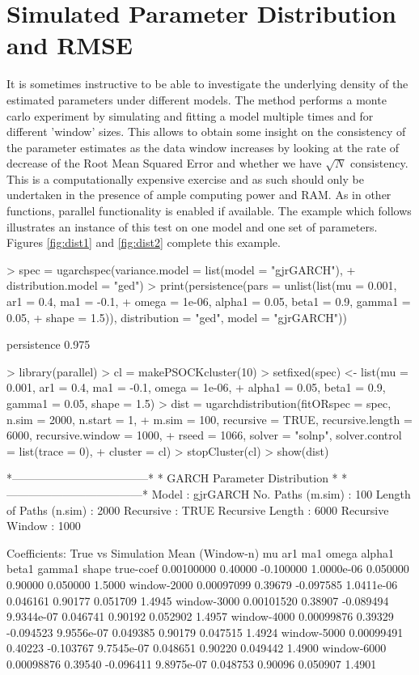 \section{Simulated Parameter Distribution and RMSE}\label{section:ugarchdist}
It is sometimes instructive to be able to investigate the underlying
density of the estimated parameters under different models. The \verb@ugarchdistribution@
method performs a monte carlo experiment by simulating and fitting a model
multiple times and for different 'window' sizes. This allows to obtain some insight
on the consistency of the parameter estimates as the data window increases by
looking at the rate of decrease of the Root Mean Squared Error and whether we
have $\sqrt N$ consistency. This is a computationally expensive exercise and as
such should only be undertaken in the presence of ample computing power and RAM.
As in other functions, parallel functionality is enabled if available.
The example which follows illustrates an instance of this test on one model and
one set of parameters. Figures \ref{fig:dist1} and \ref{fig:dist2} complete this
example.
\begin{Schunk}
\begin{Sinput}
> spec = ugarchspec(variance.model = list(model = "gjrGARCH"),
+     distribution.model = "ged")
> print(persistence(pars = unlist(list(mu = 0.001, ar1 = 0.4, ma1 = -0.1,
+     omega = 1e-06, alpha1 = 0.05, beta1 = 0.9, gamma1 = 0.05,
+     shape = 1.5)), distribution = "ged", model = "gjrGARCH"))
\end{Sinput}
\begin{Soutput}
persistence
      0.975
\end{Soutput}
\begin{Sinput}
> library(parallel)
> cl = makePSOCKcluster(10)
> setfixed(spec) <- list(mu = 0.001, ar1 = 0.4, ma1 = -0.1, omega = 1e-06,
+     alpha1 = 0.05, beta1 = 0.9, gamma1 = 0.05, shape = 1.5)
> dist = ugarchdistribution(fitORspec = spec, n.sim = 2000, n.start = 1,
+     m.sim = 100, recursive = TRUE, recursive.length = 6000, recursive.window = 1000,
+     rseed = 1066, solver = "solnp", solver.control = list(trace = 0),
+     cluster = cl)
> stopCluster(cl)
> show(dist)
\end{Sinput}
\begin{Soutput}
*------------------------------------*
*    GARCH Parameter Distribution    *
*------------------------------------*
Model : gjrGARCH
No. Paths (m.sim) : 100
Length of Paths (n.sim) : 2000
Recursive : TRUE
Recursive Length : 6000
Recursive Window : 1000

Coefficients: True vs Simulation Mean (Window-n)
                    mu     ar1       ma1      omega   alpha1   beta1   gamma1  shape
true-coef   0.00100000 0.40000 -0.100000 1.0000e-06 0.050000 0.90000 0.050000 1.5000
window-2000 0.00097099 0.39679 -0.097585 1.0411e-06 0.046161 0.90177 0.051709 1.4945
window-3000 0.00101520 0.38907 -0.089494 9.9344e-07 0.046741 0.90192 0.052902 1.4957
window-4000 0.00099876 0.39329 -0.094523 9.9556e-07 0.049385 0.90179 0.047515 1.4924
window-5000 0.00099491 0.40223 -0.103767 9.7545e-07 0.048651 0.90220 0.049442 1.4900
window-6000 0.00098876 0.39540 -0.096411 9.8975e-07 0.048753 0.90096 0.050907 1.4901
\end{Soutput}
\end{Schunk}
